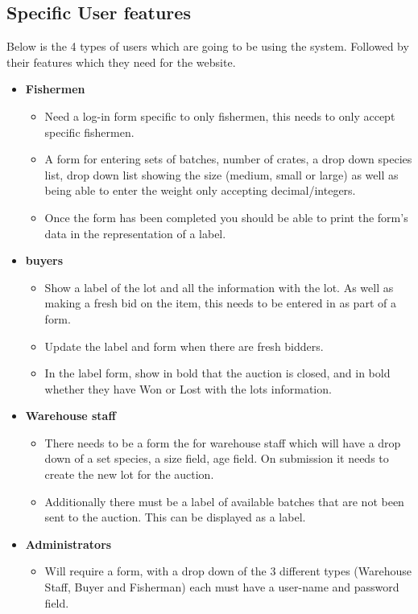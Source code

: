 \documentclass{article}
\begin{document}
\subsection{Specific User features}
Below is the 4 types of users which are going to be using the system. Followed by their features which they need for the website. 
\begin{itemize}
	\item \textbf{Fishermen}
	\begin{itemize}
		\item Need a log-in form specific to only fishermen, this needs to only accept specific fishermen. 
		\item A form for entering sets of batches, number of crates, a drop down species list, drop down list showing the size (medium, small or large) as well as being able to enter the weight only accepting decimal/integers.
		\item Once the form has been completed you should be able to print the form's data in the representation of a label.
	\end{itemize}
	\item \textbf{buyers}
		\begin{itemize}
			\item Show a label of the lot and all the information with the lot. As well as making a fresh bid on the item, this needs to be entered in as part of a form. 
			\item Update the label and form when there are fresh bidders. 
			\item In the label form, show in bold that the auction is closed, and in bold whether they have Won or Lost with the lots information.
		\end{itemize}
	\item \textbf{Warehouse staff}
		\begin{itemize}
			\item There needs to be a form the for warehouse staff which will have a drop down of a set species, a size field, age field. On submission it needs to create the new lot for the auction. 
			\item Additionally there must be a label of available batches that are not been sent to the auction. This can be displayed as a label.  
		\end{itemize}
	\item \textbf{Administrators}
	\begin{itemize}
			\item Will require a form, with a drop down of the 3 different types (Warehouse Staff, Buyer and Fisherman) each must have a user-name and password field. 
		\end{itemize}
\end{itemize}
\end{document}
